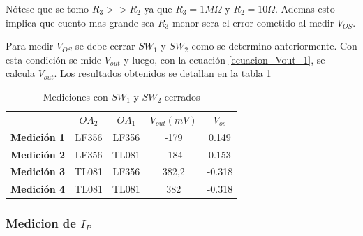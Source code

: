 Nótese que se tomo $R_3 >> R_2$ ya que $R_3 = 1M\Omega $ y $R_2 = 10\Omega$. Ademas esto implica que cuento mas grande sea $R_3$ menor sera el error cometido al medir $V_{OS}$.  

Para medir $V_{OS}$ se debe cerrar $SW_1$ y $SW_2$ como se determino anteriormente. Con esta condición se mide $V_{out}$ y luego, con la ecuación \ref{ecuacion_Vout_1}, se calcula $V_{out}$. Los resultados obtenidos se detallan en la tabla \ref{table2}

\begin{table}[h!]
    \centering
    \caption{Mediciones con $SW_1$ y $SW_2$ cerrados}
    \label{table2}
    \begin{tabular}{@{}ccccc@{}}
    
    \textbf{}           & \textbf{$OA_2$} & \textbf{$OA_1$} & \textbf{$V_{out}(mV)$} & \textbf{$V_{os}$} \\
    \textbf{Medición 1} & LF356          & LF356          & -179              &  0.149            \\
    \textbf{Medición 2} & LF356          & TL081          & -184              &  0.153            \\
    \textbf{Medición 3} & TL081          & LF356          & 382,2             &  -0.318            \\
    \textbf{Medición 4} & TL081          & TL081          & 382               &  -0.318            \\ 
    \end{tabular}
\end{table}


\subsubsection{Medicion de $I_{P}$}

